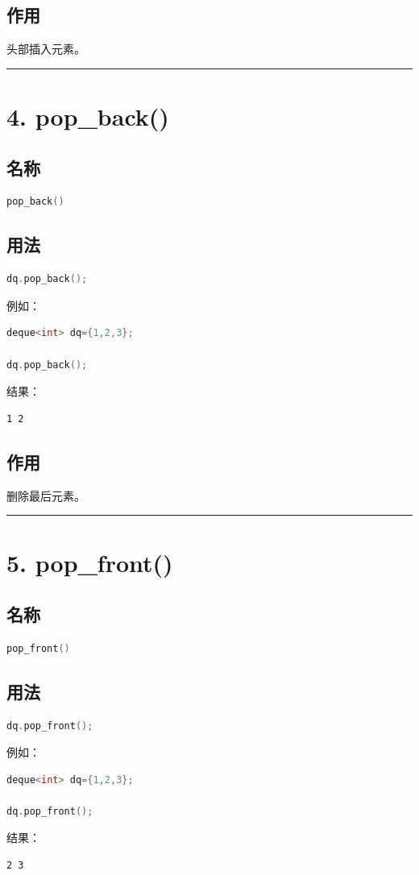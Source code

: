 \documentclass[9pt,twocolumn]{extarticle}
\begin{document}
\subsection{作用}
头部插入元素。

\noindent\rule{\linewidth}{0.4pt}

\section{4. pop\_back()}

\subsection{名称}
\begin{lstlisting}[language=C++]
pop_back()
\end{lstlisting}

\subsection{用法}
\begin{lstlisting}[language=C++]
dq.pop_back();
\end{lstlisting}
例如：
\begin{lstlisting}[language=C++]
deque<int> dq={1,2,3};

dq.pop_back();
\end{lstlisting}
结果：
\begin{lstlisting}
1 2
\end{lstlisting}

\subsection{作用}
删除最后元素。

\noindent\rule{\linewidth}{0.4pt}

\section{5. pop\_front()}

\subsection{名称}
\begin{lstlisting}[language=C++]
pop_front()
\end{lstlisting}

\subsection{用法}
\begin{lstlisting}[language=C++]
dq.pop_front();
\end{lstlisting}
例如：
\begin{lstlisting}[language=C++]
deque<int> dq={1,2,3};

dq.pop_front();
\end{lstlisting}
结果：
\begin{lstlisting}
2 3
\end{lstlisting}
\end{document}

